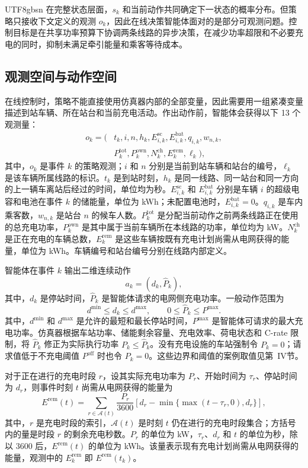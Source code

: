 \documentclass[conference]{IEEEtran}
\begin{document}
\begin{CJK*}{UTF8}{gbsn}
在完整状态层面，$s_k$ 和当前动作共同确定下一状态的概率分布。但策略只接收下文定义的观测 $o_k$，因此在线决策智能体面对的是部分可观测问题。控制目标是在共享功率预算下协调两条线路的异步决策，在减少功率超限和不必要充电的同时，抑制未满足牵引能量和乘客等待成本。

\subsection{观测空间与动作空间}
在线控制时，策略不能直接使用仿真器内部的全部变量，因此需要用一组紧凑变量描述到站车辆、所在站台和当前充电活动。作出动作前，智能体会获得以下 13 个观测量：
\begin{align}
 o_k = (&t_k,i,n,h_k,E^{\mathrm{sc}}_{i,k},E^{\mathrm{bat}}_{i,k},
 q_{i,k},w_{n,k},\nonumber\\
 &P^{\mathrm{tot}}_k,P^{\mathrm{own}}_k,N^{\mathrm{ch}}_k,
 E^{\mathrm{rem}}_k,\ell_k),
\end{align}
其中，$o_k$ 是事件 $k$ 的策略观测；$i$ 和 $n$ 分别是当前到站车辆和站台的编号，$\ell_k$ 是该车辆所属线路的标识。$t_k$ 是到站时刻，$h_k$ 是同一线路、同一站台和同一方向的上一辆车离站后经过的时间，单位均为秒。$E^{\mathrm{sc}}_{i,k}$ 和 $E^{\mathrm{bat}}_{i,k}$ 分别是车辆 $i$ 的超级电容和电池在事件 $k$ 的储能量，单位为 kWh；未配置电池时，$E^{\mathrm{bat}}_{i,k}=0$。$q_{i,k}$ 是车内乘客数，$w_{n,k}$ 是站台 $n$ 的候车人数。$P^{\mathrm{tot}}_k$ 是分配当前动作之前两条线路正在使用的总充电功率，$P^{\mathrm{own}}_k$ 是其中属于当前车辆所在本线路的功率，单位均为 kW。$N^{\mathrm{ch}}_k$ 是正在充电的车辆总数，$E^{\mathrm{rem}}_k$ 是这些车辆按既有充电计划尚需从电网获得的能量，单位为 kWh。车辆编号和站台编号分别在线路内部定义。

智能体在事件 $k$ 输出二维连续动作
\begin{equation}
    a_k = (d_k, \widehat{P}_k),
\end{equation}
其中，$d_k$ 是停站时间，$\widehat{P}_k$ 是智能体请求的电网侧充电功率。一般动作范围为
\begin{equation}
    d^{\min} \le d_k \le d^{\max}, \qquad
    0 \le \widehat{P}_k \le P^{\max}.
\end{equation}
其中，$d^{\min}$ 和 $d^{\max}$ 是允许的最短和最长停站时间，$P^{\max}$ 是智能体可请求的最大充电功率。仿真器根据车站功率、储能剩余容量、充电效率、荷电状态和 C-rate 限制，将 $\widehat{P}_k$ 修正为实际执行功率 $P_k\leq\widehat{P}_k$。没有充电设施的车站强制令 $P_k=0$；请求值低于不充电阈值 $P^{\mathrm{off}}$ 时也令 $P_k=0$。这些边界和阈值的案例取值见第~IV节。

对于正在进行的充电时段 $r$，设其实际充电功率为 $P_r$、开始时间为 $\tau_r$、停站时间为 $d_r$，则事件时刻 $t$ 尚需从电网获得的能量为
\begin{equation}
 E^{\mathrm{rem}}(t)=\sum_{r\in\mathcal{A}(t)}
 \frac{P_r}{3600}\left[d_r-\min\{\max(t-\tau_r,0),d_r\}\right],
\end{equation}
其中，$r$ 是充电时段的索引，$\mathcal{A}(t)$ 是时刻 $t$ 仍在进行的充电时段集合；方括号内的量是时段 $r$ 的剩余充电秒数。$P_r$ 的单位为 kW，$\tau_r$、$d_r$ 和 $t$ 的单位为秒，除以 3600 后，$E^{\mathrm{rem}}(t)$ 的单位为 kWh。该量表示现有充电计划尚需从电网获得的能量，观测中的 $E^{\mathrm{rem}}_k$ 即 $E^{\mathrm{rem}}(t_k)$。


\end{CJK*}
\end{document}

